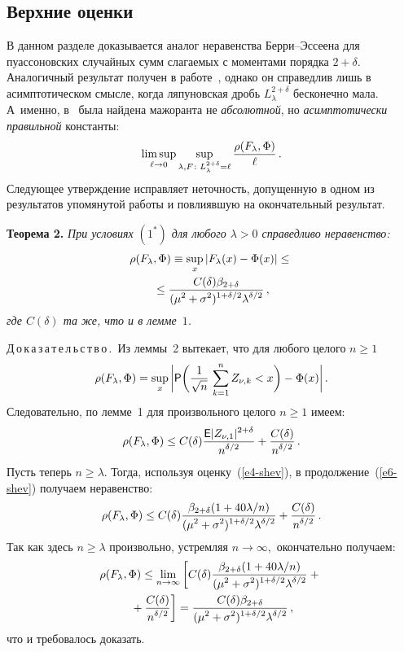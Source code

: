 \begin{multicols}{2}
  \subsection{Верхние оценки}
  
  В данном разделе доказывается аналог неравенства Бер\-ри--Эс\-се\-ена для
пуассоновских случайных сумм слагаемых с моментами порядка
$2+\delta$. Аналогичный результат получен в работе~\cite{S2007},
однако он справедлив лишь в асимптотическом смысле, когда
ляпуновская дробь $L_\lambda^{2+\delta}$ бесконечно мала. А~именно,
в~\cite{S2007} была найдена мажоранта не {\it абсолютной}, но {\it
асимптотически правильной} константы:
$$
\limsup\limits_{\ell\rightarrow0}\sup_{\lambda,F\colon
L_\lambda^{2+\delta}=\ell} \displaystyle\frac{\displaystyle \rho(F_\lambda,\Phi)\mathstrut}{\displaystyle \ell\mathstrut}\,.
$$
Следующее утверждение исправляет неточность, допущенную в одном из
результатов упомянутой работы и повлиявшую на окончательный
результат.

  \medskip

\noindent
\textbf{Теорема 2.} \textit{При условиях $(1^\ast)$ для любого
$\lambda>0$ справедливо неравенство:}
\begin{multline}
\rho(F_\lambda,\Phi)\equiv \sup_x|F_\lambda(x) -
\Phi(x)|\le{}\\
{}\le
\displaystyle\frac{\displaystyle C(\delta)\beta_{2+\delta}\mathstrut}{\displaystyle (\mu^2+\sigma^2)^{1+\delta/2}\lambda^{\delta/2}\mathstrut}\,, 
\label{e5-shev}
\end{multline}
\textit{где $C(\delta)$ та же, что и в лемме~$1$.}

  \medskip

  \noindent
  Д\,о\,к\,а\,з\,а\,т\,е\,л\,ь\,с\,т\,в\,о\,.\ Из леммы~2 вытекает,
что для любого целого $n\ge1$
$$
\rho(F_\lambda,\Phi) =
\sup_x\bigg|{{\sf P}}\bigg(\displaystyle\frac{\displaystyle 1\mathstrut}{\displaystyle \sqrt{n}\mathstrut}\,\sum_{k=1}^n
Z_{\nu,k}<x\bigg)-\Phi(x)\bigg|\,.
$$ 
Следовательно, по лемме~1 для произвольного целого $n\ge1$ имеем:
\begin{equation}
\rho(F_\lambda,\Phi) \le
C(\delta)\displaystyle\frac{\displaystyle {{\sf E}}|Z_{\nu,1}|^{2+\delta}\mathstrut}{\displaystyle n^{\delta/2}\mathstrut}+\displaystyle\frac{\displaystyle C(\delta)\mathstrut}{\displaystyle n^{\delta/2}\mathstrut}\,. \label{e6-shev}
\end{equation} 
Пусть теперь $n\ge\lambda$. Тогда, используя оценку~(\ref{e4-shev}), 
в продолжение~(\ref{e6-shev}) получаем неравенство:
$$
\rho(F_\lambda,\Phi)\le C(\delta) 
\displaystyle\frac{\displaystyle \beta_{2+\delta}(1+40{\lambda}/{n})\mathstrut}{\displaystyle (\mu^2+\sigma^2)^{1+\delta/2}\lambda^{\delta/2}\mathstrut}+
\displaystyle\frac{\displaystyle C(\delta)\mathstrut}{\displaystyle n^{\delta/2}\mathstrut}\,.
$$
Так как здесь $n\ge\lambda$ произвольно, устремляя
$n\rightarrow\infty,$ окончательно получаем:
\begin{multline*}
\rho(F_\lambda,\Phi)\le \lim_{n\rightarrow\infty}\left[C(\delta)
\displaystyle\frac{\displaystyle \beta_{2+\delta}(1+40{\lambda}/n)\mathstrut}{\displaystyle (\mu^2+\sigma^2)^{1+\delta/2}\lambda^{\delta/2}\mathstrut}+{}\right.\\
\left.{}+
\displaystyle\frac{\displaystyle C(\delta)\mathstrut}{\displaystyle n^{\delta/2}\mathstrut}\right] = 
\displaystyle\frac{\displaystyle C(\delta)\beta_{2+\delta}\mathstrut}{\displaystyle (\mu^2+\sigma^2)^{1+\delta/2}\lambda^{\delta/2}\mathstrut}\,,
\end{multline*}
что и требовалось доказать.


\end{multicols}
